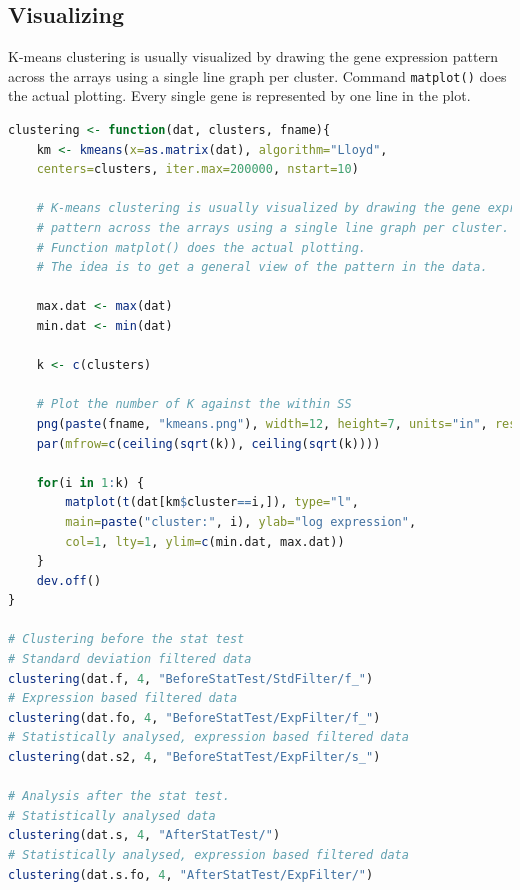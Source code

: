 \documentclass[oneside, a4paper, 11pt]{book}
\begin{document}
\subsection{Visualizing}
K-means clustering is usually visualized by drawing the gene expression pattern across the arrays using a single line graph per cluster. Command \texttt{matplot()} does the actual plotting. Every single gene is represented by one line in the plot.

\begin{lstlisting}[language=R, caption=k-means Clustering]
clustering <- function(dat, clusters, fname){
    km <- kmeans(x=as.matrix(dat), algorithm="Lloyd",
    centers=clusters, iter.max=200000, nstart=10)
    
    # K-means clustering is usually visualized by drawing the gene expression
    # pattern across the arrays using a single line graph per cluster.
    # Function matplot() does the actual plotting.
    # The idea is to get a general view of the pattern in the data.
    
    max.dat <- max(dat)
    min.dat <- min(dat)
    
    k <- c(clusters)

    # Plot the number of K against the within SS
    png(paste(fname, "kmeans.png"), width=12, height=7, units="in", res=250)
    par(mfrow=c(ceiling(sqrt(k)), ceiling(sqrt(k))))
    
    for(i in 1:k) {
        matplot(t(dat[km$cluster==i,]), type="l",
        main=paste("cluster:", i), ylab="log expression",
        col=1, lty=1, ylim=c(min.dat, max.dat))
    }
    dev.off()
}

# Clustering before the stat test
# Standard deviation filtered data
clustering(dat.f, 4, "BeforeStatTest/StdFilter/f_")
# Expression based filtered data
clustering(dat.fo, 4, "BeforeStatTest/ExpFilter/f_")
# Statistically analysed, expression based filtered data
clustering(dat.s2, 4, "BeforeStatTest/ExpFilter/s_")

# Analysis after the stat test.
# Statistically analysed data
clustering(dat.s, 4, "AfterStatTest/")
# Statistically analysed, expression based filtered data
clustering(dat.s.fo, 4, "AfterStatTest/ExpFilter/")
\end{lstlisting}
\end{document}
